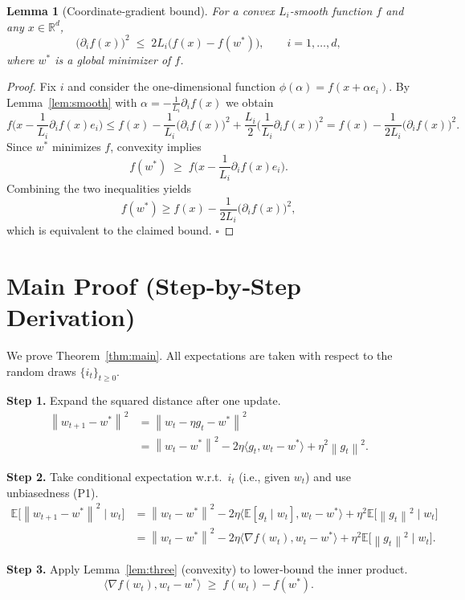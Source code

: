 \documentclass{article}
\newcommand{\E}{\mathbb{E}}
\newcommand{\R}{\mathbb{R}}
\newcommand{\norm}[1]{\left\|#1\right\|}
\newcommand{\ip}[2]{\langle #1,#2\rangle}
\newtheorem{lemma}{Lemma}
\begin{document}
\begin{lemma}[Coordinate‑gradient bound]\label{lem:gradbound}
For a convex $L_i$‑smooth function $f$ and any $x\in\R^{d}$,
\[
\big(\partial_i f(x)\big)^2\;\le\;2L_i\big(f(x)-f(w^*)\big),\qquad i=1,\dots,d,
\]
where $w^*$ is a global minimizer of $f$.
\end{lemma}
\begin{proof}
Fix $i$ and consider the one‑dimensional function $\phi(\alpha)=f(x+\alpha e_i)$.  
By Lemma~\ref{lem:smooth} with $\alpha=-\frac{1}{L_i}\partial_i f(x)$ we obtain
\[
f\!\Big(x-\frac{1}{L_i}\partial_i f(x)e_i\Big)
\le f(x)-\frac{1}{L_i}\big(\partial_i f(x)\big)^2
      +\frac{L_i}{2}\Big(\frac{1}{L_i}\partial_i f(x)\Big)^2
= f(x)-\frac{1}{2L_i}\big(\partial_i f(x)\big)^2 .
\]
Since $w^*$ minimizes $f$, convexity implies
\[
f(w^*)\;\ge\;f\!\Big(x-\frac{1}{L_i}\partial_i f(x)e_i\Big).
\]
Combining the two inequalities yields
\[
f(w^*)\ge f(x)-\frac{1}{2L_i}\big(\partial_i f(x)\big)^2,
\]
which is equivalent to the claimed bound. \hfill $\square$
\end{proof}

\section*{Main Proof (Step‑by‑Step Derivation)}
We prove Theorem~\ref{thm:main}. All expectations are taken with respect to the random draws
$\{i_t\}_{t\ge0}$.

\noindent\textbf{Step 1.} Expand the squared distance after one update.
\[
\begin{aligned}
\norm{w_{t+1}-w^*}^2
&=\norm{w_t-\eta g_t-w^*}^2 \\
&=\norm{w_t-w^*}^2-2\eta\ip{g_t}{w_t-w^*}+\eta^2\norm{g_t}^2 .
\end{aligned}
\tag{S1}
\]

\noindent\textbf{Step 2.} Take conditional expectation w.r.t.\ $i_t$ (i.e., given $w_t$) and use unbiasedness (P1).
\[
\begin{aligned}
\E\!\big[\norm{w_{t+1}-w^*}^2\mid w_t\big]
&=\norm{w_t-w^*}^2-2\eta\ip{\E[g_t\mid w_t]}{w_t-w^*}
      +\eta^2\E\!\big[\norm{g_t}^2\mid w_t\big] \\
&=\norm{w_t-w^*}^2-2\eta\ip{\nabla f(w_t)}{w_t-w^*}
      +\eta^2\E\!\big[\norm{g_t}^2\mid w_t\big].
\end{aligned}
\tag{S2}
\]

\noindent\textbf{Step 3.} Apply Lemma~\ref{lem:three} (convexity) to lower‑bound the inner product.
\[
\ip{\nabla f(w_t)}{w_t-w^*}\;\ge\; f(w_t)-f(w^*).
\tag{S3}
\]
\end{document}
